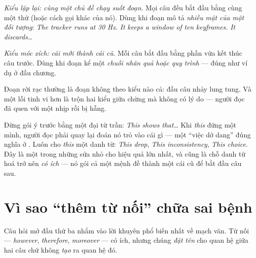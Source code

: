 \documentclass[../../english.tex]{subfiles}
\begin{document}
\emph{Kiểu lặp lại: cùng một chủ đề chạy suốt đoạn.} Mọi câu đều bắt đầu bằng cùng một thứ (hoặc cách gọi khác của nó). Dùng khi đoạn mô tả \emph{nhiều mặt của một đối tượng}: \emph{The tracker runs at 30 Hz. It keeps a window of ten keyframes. It discards\ldots}

\emph{Kiểu móc xích: cái mới thành cái cũ.} Mỗi câu bắt đầu bằng phần vừa kết thúc câu trước. Dùng khi đoạn kể một \emph{chuỗi nhân quả hoặc quy trình} --- đúng như ví dụ ở đầu chương.

Đoạn rời rạc thường là đoạn không theo kiểu nào cả: đầu câu nhảy lung tung. Và một lỗi tinh vi hơn là trộn hai kiểu giữa chừng mà không có lý do --- người đọc đã quen với một nhịp rồi bị hẫng.

\begin{mauau}
\end{mauau}

\begin{cambay}
Đừng gói ý trước bằng một đại từ trần: \emph{This shows that\ldots} Khi \emph{this} đứng một mình, người đọc phải quay lại đoán nó trỏ vào cái gì --- một ``việc dở dang'' đúng nghĩa ở . Luôn cho \emph{this} một danh từ: \emph{This drop}, \emph{This inconsistency}, \emph{This choice}. Đây là một trong những sửa nhỏ cho hiệu quả lớn nhất, và cũng là chỗ danh từ hoá trở nên \emph{có ích} --- nó gói cả một mệnh đề thành một cái cũ để bắt đầu câu sau.
\end{cambay}

\section{Vì sao ``thêm từ nối'' chữa sai bệnh}

Câu hỏi mở đầu thứ ba nhắm vào lời khuyên phổ biến nhất về mạch văn. Từ nối --- \emph{however}, \emph{therefore}, \emph{moreover} --- có ích, nhưng chúng \emph{đặt tên} cho quan hệ giữa hai câu chứ không \emph{tạo} ra quan hệ đó.
\end{document}

